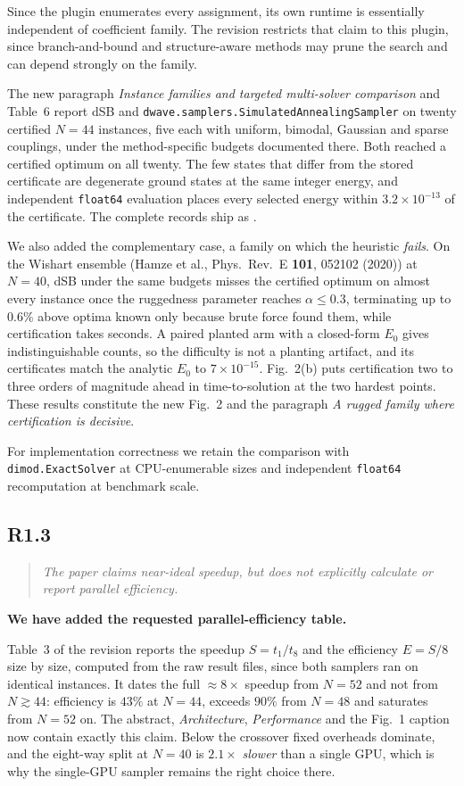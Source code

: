 \documentclass[11pt,a4paper]{article}
\newenvironment{reviewercomment}
  {\begin{quote}\itshape\small}
  {\end{quote}}
\newcommand{\point}[2]{%
  \subsection*{#1}%
  \begin{reviewercomment}#2\end{reviewercomment}}
\begin{document}
Since the plugin enumerates every assignment, its own runtime is essentially independent of
coefficient family. The revision restricts that claim to this plugin, since branch-and-bound
and structure-aware methods may prune the search and can depend strongly on the family.

The new paragraph \emph{Instance families and targeted multi-solver comparison} and Table~6
report dSB and \texttt{dwave.samplers.SimulatedAnnealingSampler} on twenty certified $N=44$
instances, five each with uniform, bimodal, Gaussian and sparse couplings, under the
method-specific budgets documented there. Both reached a certified optimum on all twenty. The
few states that differ from the stored certificate are degenerate ground states at the same
integer energy, and independent \texttt{float64} evaluation places every selected energy within
$3.2\times10^{-13}$ of the certificate. The complete records ship as
.

We also added the complementary case, a family on which the heuristic \emph{fails}. On the
Wishart ensemble (Hamze et al., Phys.\ Rev.\ E \textbf{101}, 052102 (2020)) at $N=40$, dSB
under the same budgets misses the certified optimum on almost every instance once the
ruggedness parameter reaches $\alpha\leq0.3$, terminating up to $0.6\%$ above optima known
only because brute force found them, while certification takes seconds. A paired planted arm
with a closed-form $E_0$ gives indistinguishable counts, so the difficulty is not a planting
artifact, and its certificates match the analytic $E_0$ to $7\times10^{-15}$. Fig.~2(b) puts
certification two to three orders of magnitude ahead in time-to-solution at the two hardest
points. These results constitute the new Fig.~2 and the paragraph \emph{A rugged family where
certification is decisive}.

For implementation correctness we retain the comparison with \texttt{dimod.ExactSolver} at
CPU-enumerable sizes and independent \texttt{float64} recomputation at benchmark scale.

\point{R1.3}{The paper claims near-ideal speedup, but does not explicitly calculate or report
parallel efficiency.}

\textbf{We have added the requested parallel-efficiency table.}

Table~3 of the revision reports the speedup $S=t_1/t_8$ and the efficiency $E=S/8$ size by
size, computed from the raw result files, since both samplers ran on identical instances. It
dates the full $\approx\!8\times$ speedup from $N=52$ and not from $N \gtrsim 44$: efficiency
is $43\%$ at $N=44$, exceeds $90\%$ from $N=48$ and saturates from $N=52$ on. The abstract,
\emph{Architecture}, \emph{Performance} and the Fig.~1 caption now contain exactly this claim.
Below the crossover
fixed overheads dominate, and the eight-way split at $N=40$ is $2.1\times$ \emph{slower} than a
single GPU, which is why the single-GPU sampler remains the right choice there.
\end{document}

